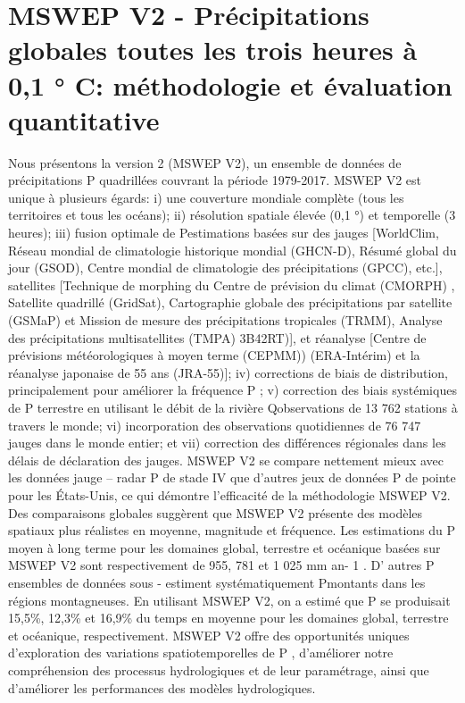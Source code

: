 \section{MSWEP V2 - Précipitations globales toutes les trois heures à 0,1 ° C: méthodologie et évaluation quantitative}
Nous présentons la version 2 (MSWEP V2), un ensemble de données de précipitations P quadrillées couvrant la période 1979-2017. MSWEP V2 est unique à plusieurs égards: i) une couverture mondiale complète (tous les territoires et tous les océans); ii) résolution spatiale élevée (0,1 °) et temporelle (3 heures); iii) fusion optimale de Pestimations basées sur des jauges [WorldClim, Réseau mondial de climatologie historique mondial (GHCN-D), Résumé global du jour (GSOD), Centre mondial de climatologie des précipitations (GPCC), etc.], satellites [Technique de morphing du Centre de prévision du climat (CMORPH) , Satellite quadrillé (GridSat), Cartographie globale des précipitations par satellite (GSMaP) et Mission de mesure des précipitations tropicales (TRMM), Analyse des précipitations multisatellites (TMPA) 3B42RT)], et réanalyse [Centre de prévisions météorologiques à moyen terme (CEPMM)) (ERA-Intérim) et la réanalyse japonaise de 55 ans (JRA-55)]; iv) corrections de biais de distribution, principalement pour améliorer la fréquence P ; v) correction des biais systémiques de P terrestre en utilisant le débit de la rivière Qobservations de 13 762 stations à travers le monde; vi) incorporation des observations quotidiennes de 76 747 jauges dans le monde entier; et vii) correction des différences régionales dans les délais de déclaration des jauges. MSWEP V2 se compare nettement mieux avec les données jauge – radar P de stade IV que d’autres jeux de données P de pointe pour les États-Unis, ce qui démontre l’efficacité de la méthodologie MSWEP V2. Des comparaisons globales suggèrent que MSWEP V2 présente des modèles spatiaux plus réalistes en moyenne, magnitude et fréquence. Les estimations du P moyen à long terme pour les domaines global, terrestre et océanique basées sur MSWEP V2 sont respectivement de 955, 781 et 1 025 mm an- 1 . D' autres P ensembles de données sous - estiment systématiquement Pmontants dans les régions montagneuses. En utilisant MSWEP V2, on a estimé que P se produisait 15,5\%, 12,3\% et 16,9\% du temps en moyenne pour les domaines global, terrestre et océanique, respectivement. MSWEP V2 offre des opportunités uniques d’exploration des variations spatiotemporelles de P , d’améliorer notre compréhension des processus hydrologiques et de leur paramétrage, ainsi que d’améliorer les performances des modèles hydrologiques.\cite{beck_mswep_2018}
